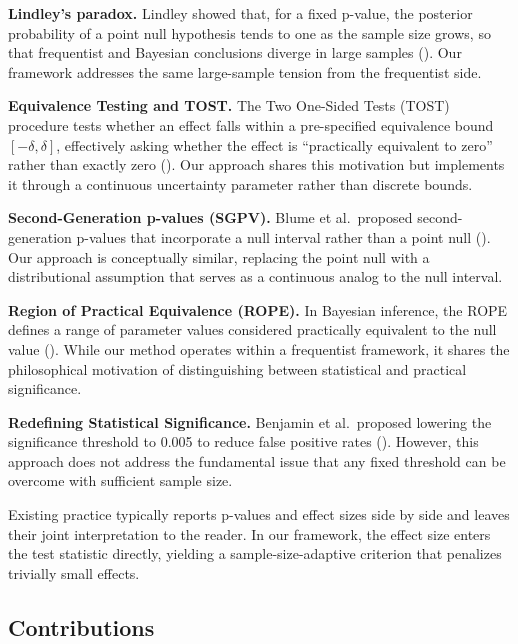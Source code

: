 \documentclass[
  11pt,
  letterpaper,
]{article}
\begin{document}
\textbf{Lindley's paradox.} Lindley showed that, for a fixed p-value,
the posterior probability of a point null hypothesis tends to one as the
sample size grows, so that frequentist and Bayesian conclusions diverge
in large samples ().
Our framework addresses the same large-sample tension from the
frequentist side.

\textbf{Equivalence Testing and TOST.} The Two One-Sided Tests (TOST)
procedure tests whether an effect falls within a pre-specified
equivalence bound \([-\delta, \delta]\), effectively asking whether the
effect is ``practically equivalent to zero'' rather than exactly zero
(). Our approach shares
this motivation but implements it through a continuous uncertainty
parameter rather than discrete bounds.

\textbf{Second-Generation p-values (SGPV).} Blume et al.~proposed
second-generation p-values that incorporate a null interval rather than
a point null (). Our
approach is conceptually similar, replacing the point null with a
distributional assumption that serves as a continuous analog to the null
interval.

\textbf{Region of Practical Equivalence (ROPE).} In Bayesian inference,
the ROPE defines a range of parameter values considered practically
equivalent to the null value
(). While
our method operates within a frequentist framework, it shares the
philosophical motivation of distinguishing between statistical and
practical significance.

\textbf{Redefining Statistical Significance.} Benjamin et al.~proposed
lowering the significance threshold to 0.005 to reduce false positive
rates (). However, this
approach does not address the fundamental issue that any fixed threshold
can be overcome with sufficient sample size.

Existing practice typically reports p-values and effect sizes side by
side and leaves their joint interpretation to the reader. In our
framework, the effect size enters the test statistic directly, yielding
a sample-size-adaptive criterion that penalizes trivially small effects.

\subsection{Contributions}\label{contributions}
\end{document}
